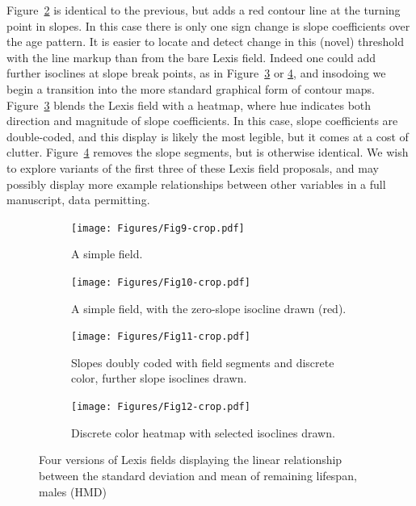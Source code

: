 \documentclass{article}
\begin{document}
Figure~\ref{fig:sfig2} is identical to the previous, but adds a red contour line
at the turning point in slopes. In this case there is only one sign change is slope
coefficients over the age pattern. It is easier to locate and detect change in
this (novel) threshold with the line markup than from the bare Lexis field.
Indeed one could add further isoclines at slope break points, as in
Figure~\ref{fig:sfig3} or \ref{fig:sfig4}, and insodoing we begin a transition
into the more standard graphical form of contour maps. Figure~\ref{fig:sfig3}
blends the Lexis field with a heatmap, where hue indicates both direction and
magnitude of slope coefficients. In this case, slope coefficients are
double-coded, and this display is likely the most legible, but it comes at a
cost of clutter. Figure~\ref{fig:sfig4} removes the slope segments, but is
otherwise identical. We wish to explore variants of the first three of these
Lexis field proposals, and may possibly display more example relationships
between other variables in a full manuscript, data permitting.

\begin{figure}
\begin{subfigure}{.5\textwidth}
  \centering
  \texttt{[image: Figures/Fig9-crop.pdf]}
  \caption{A simple field.}
  \label{fig:sfig1}
\end{subfigure}%
\begin{subfigure}{.5\textwidth}
  \centering
  \texttt{[image: Figures/Fig10-crop.pdf]}
  \caption{A simple field, with the zero-slope isocline drawn (red).}
  \label{fig:sfig2}
\end{subfigure}

\begin{subfigure}{.5\textwidth}
  \centering
  \texttt{[image: Figures/Fig11-crop.pdf]}
  \caption{Slopes doubly coded with field segments and discrete color, further
  slope isoclines drawn.}
  \label{fig:sfig3}
\end{subfigure}%
\begin{subfigure}{.5\textwidth}
  \centering
  \texttt{[image: Figures/Fig12-crop.pdf]}
  \caption{Discrete color heatmap with selected isoclines drawn.}
  \label{fig:sfig4}
\end{subfigure}
\caption{Four versions of Lexis fields displaying the linear
relationship between the standard deviation and mean of remaining
lifespan, males (HMD)}
\label{fig:fig}
\end{figure}





\nocite{vaupel1987thousands}

\FloatBarrier
\singlespacing

   
\end{document}
